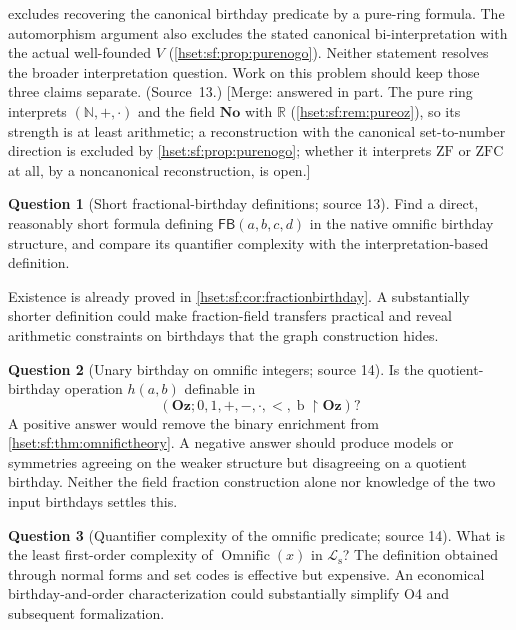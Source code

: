 \documentclass[11pt,letterpaper]{article}
\theoremstyle{definition}
\newtheorem{question}[question]{Question}\aliascntresetthe{question}
\theoremstyle{remark}
\newcommand{\No}{\mathbf{No}}
\newcommand{\bd}{\operatorname{b}}
\newcommand{\ZFC}{\mathrm{ZFC}}
\newcommand{\ZF}{\mathrm{ZF}}
\newcommand{\restr}{\mathbin{\upharpoonright}}
\newcommand{\Oz}{\mathbf{Oz}}
\newcommand{\R}{\mathbb R}
\newcommand{\N}{\mathbb N}
\newcommand{\FB}{\mathsf{FB}}
\newcommand{\Ls}{\mathcal L_{\mathrm s}}
\begin{document}
 excludes recovering the canonical birthday
predicate by a pure-ring formula. The automorphism argument also excludes the stated
canonical bi-interpretation with the actual well-founded $V$
(\cref{hset:sf:prop:purenogo}). Neither statement resolves the broader
interpretation question. Work on this problem should keep those three claims
separate. (Source~13.) [Merge: answered in part. The pure ring interprets
$(\N,+,\cdot)$ and the field $\No$ with $\R$ (\cref{hset:sf:rem:pureoz}), so its
strength is at least arithmetic; a reconstruction with the canonical set-to-number
direction is excluded by \cref{hset:sf:prop:purenogo}; whether it interprets $\ZF$
or $\ZFC$ at all, by a noncanonical reconstruction, is open.]

\begin{question}[Short fractional-birthday definitions; source 13]\label{hset:sf:q:shortFB}
Find a direct, reasonably short formula defining $\FB(a,b,c,d)$ in the native omnific
birthday structure, and compare its quantifier complexity with the
interpretation-based definition.
\end{question}

Existence is already proved in \cref{hset:sf:cor:fractionbirthday}. A substantially
shorter definition could make fraction-field transfers practical and reveal
arithmetic constraints on birthdays that the graph construction hides.

\begin{question}[Unary birthday on omnific integers; source 14]\label{hset:sf:q:unary}
Is the quotient-birthday operation $h(a,b)$ definable in
\[
 (\Oz;0,1,+,-,\cdot,<,\bd\restr\Oz)?
\]
A positive answer would remove the binary enrichment from
\cref{hset:sf:thm:omnifictheory}. A negative answer should produce models or
symmetries agreeing on the weaker structure but disagreeing on a quotient birthday.
Neither the field fraction construction alone nor knowledge of the two input
birthdays settles this.
\end{question}


\begin{question}[Quantifier complexity of the omnific predicate; source 14]\label{hset:sf:q:omnificpred}
What is the least first-order complexity of $\operatorname{Omnific}(x)$ in $\Ls$? The
definition obtained through normal forms and set codes is effective but expensive.
An economical birthday-and-order characterization could substantially simplify O4 and
subsequent formalization.
\end{question}
\end{document}
